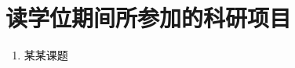 \chapter{读学位期间所参加的科研项目}

\begin{enumerate}
	\renewcommand{\labelenumi}{[\theenumi]}
	\item 某某课题
\end{enumerate}
